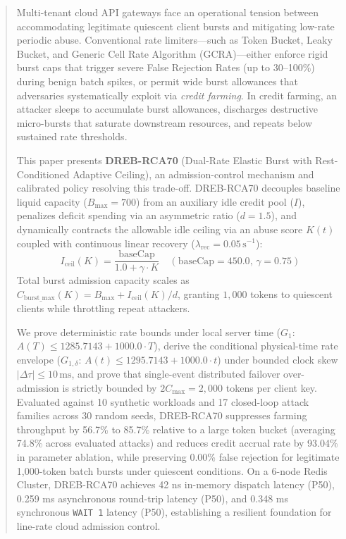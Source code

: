 \documentclass[conference]{IEEEtran}
\begin{document}
\begin{abstract}
Multi-tenant cloud API gateways face an operational tension between accommodating legitimate quiescent client bursts and mitigating low-rate periodic abuse. Conventional rate limiters---such as Token Bucket, Leaky Bucket, and Generic Cell Rate Algorithm (GCRA)---either enforce rigid burst caps that trigger severe False Rejection Rates (up to 30--100\%) during benign batch spikes, or permit wide burst allowances that adversaries systematically exploit via \textit{credit farming}. In credit farming, an attacker sleeps to accumulate burst allowances, discharges destructive micro-bursts that saturate downstream resources, and repeats below sustained rate thresholds.

This paper presents \textbf{DREB-RCA70} (Dual-Rate Elastic Burst with Rest-Conditioned Adaptive Ceiling), an admission-control mechanism and calibrated policy resolving this trade-off. DREB-RCA70 decouples baseline liquid capacity ($B_{\max} = 700$) from an auxiliary idle credit pool ($I$), penalizes deficit spending via an asymmetric ratio ($d = 1.5$), and dynamically contracts the allowable idle ceiling via an abuse score $K(t)$ coupled with continuous linear recovery ($\lambda_{\text{rec}} = 0.05\,\text{s}^{-1}$):
$$I_{\text{ceil}}(K) = \frac{\text{baseCap}}{1.0 + \gamma \cdot K} \quad (\text{baseCap} = 450.0, \, \gamma = 0.75)$$
Total burst admission capacity scales as $C_{\text{burst\_max}}(K) = B_{\max} + I_{\text{ceil}}(K)/d$, granting $1,000$ tokens to quiescent clients while throttling repeat attackers.

We prove deterministic rate bounds under local server time ($G_1$: $A(T) \le 1285.7143 + 1000.0 \cdot T$), derive the conditional physical-time rate envelope ($G_{1,\delta}$: $A(t) \le 1295.7143 + 1000.0 \cdot t$) under bounded clock skew $|\Delta \tau| \le 10\,\text{ms}$, and prove that single-event distributed failover over-admission is strictly bounded by $2 C_{\max} = 2,000$ tokens per client key. Evaluated against 10 synthetic workloads and 17 closed-loop attack families across 30 random seeds, DREB-RCA70 suppresses farming throughput by 56.7\% to 85.7\% relative to a large token bucket (averaging 74.8\% across evaluated attacks) and reduces credit accrual rate by 93.04\% in parameter ablation, while preserving 0.00\% false rejection for legitimate 1,000-token batch bursts under quiescent conditions. On a 6-node Redis Cluster, DREB-RCA70 achieves 42 ns in-memory dispatch latency (P50), 0.259 ms asynchronous round-trip latency (P50), and 0.348 ms synchronous \texttt{WAIT 1} latency (P50), establishing a resilient foundation for line-rate cloud admission control.
\end{abstract}
\end{document}
